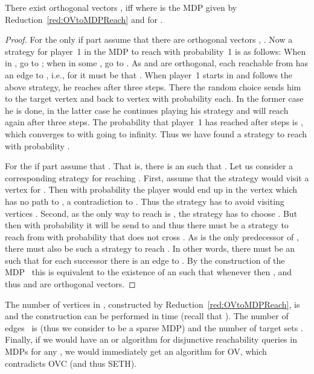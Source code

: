 \documentclass[11pt,letterpaper]{article}
\begin{document}
\begin{lemma}
There exist orthogonal vectors ,  iff  where 
 is the MDP  given by Reduction~\ref{red:OVtoMDPReach} and   for .
\end{lemma}
\begin{proof}
 For the only if part assume that there are orthogonal vectors , .
 Now a strategy for player~1 in the MDP  to reach  with probability~1 is as follows:
 When in , go to ; when in some , go to .
 As  and  are orthogonal, each  reachable from  has an edge to , i.e.,
 for  it must be that .
 When player~1 starts in  and follows the above strategy, 
 he reaches  after three steps. There the random choice sends
 him to the target vertex  and back to vertex  with probability  each.
 In the former case he is done, in the latter case
 he continues playing his strategy and will reach  again after three steps.
 The probability that player~1 has reached  after  steps is ,
 which converges to  with  going to infinity.
 Thus we have found a strategy to reach  with probability .

 For the if part assume that . 
 That is, there is an  such that .
 Let us consider a corresponding strategy for reaching .
 First, assume that the strategy would visit a vertex  for .
 Then with probability  the player would end up in the vertex  which has no path to , 
 a contradiction to . 
 Thus the strategy has to avoid visiting vertices .
 Second, as the only way to reach  is , the strategy has to choose .
 But then with probability  it will be send to 
 and thus there must be a strategy to reach  from  with probability  that does not cross .
 As  is the only predecessor of , there must also be such a strategy to reach .
 In other words, there must be an  such that for each successor  there 
 is an edge to . 
 By the construction of the MDP~ this is equivalent to the existence of
 an   such that whenever  then , 
 and thus  and  are orthogonal vectors.
\end{proof}

The number of vertices in , constructed by Reduction~\ref{red:OVtoMDPReach},
is  and the construction can be performed in 
 time (recall that ). 
The number of edges~ is  (thus we consider 
to be a sparse MDP) and the number of target sets .
Finally, if we would have an   or  algorithm for disjunctive reachability queries in MDPs for any , we
would immediately get an  algorithm for OV, which contradicts OVC (and thus SETH).
\end{document}
